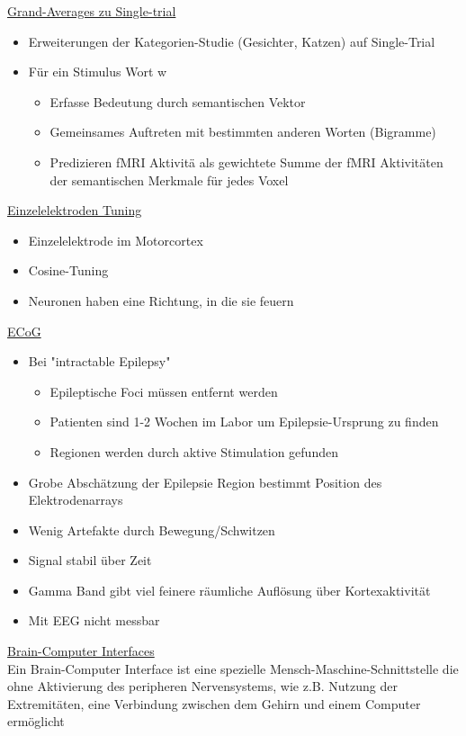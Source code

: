 \documentclass[a4paper,10pt,oneside]{article}
\begin{document}
\underline{Grand-Averages zu Single-trial} \\
	\begin{itemize}
		\item Erweiterungen der Kategorien-Studie (Gesichter, Katzen) auf Single-Trial
		\item Für ein Stimulus Wort w
			\begin{itemize}
				\item Erfasse Bedeutung durch semantischen Vektor
				\item Gemeinsames Auftreten mit bestimmten anderen Worten (Bigramme)
				\item Predizieren fMRI Aktivitä als gewichtete Summe der fMRI Aktivitäten der semantischen Merkmale für jedes Voxel
			\end{itemize}
	\end{itemize}

\underline{Einzelelektroden Tuning} \\
	\begin{itemize}
		\item Einzelelektrode im Motorcortex
		\item Cosine-Tuning
		\item Neuronen haben eine Richtung, in die sie feuern
	\end{itemize}
	
\underline{ECoG} \\
	\begin{itemize}
		\item Bei "intractable Epilepsy"
			\begin{itemize}
				\item Epileptische Foci müssen entfernt werden
				\item Patienten sind 1-2 Wochen im Labor um Epilepsie-Ursprung zu finden
				\item Regionen werden durch aktive Stimulation gefunden
			\end{itemize}
		\item Grobe Abschätzung der Epilepsie Region bestimmt Position des Elektrodenarrays
		\item Wenig Artefakte durch Bewegung/Schwitzen
		\item Signal stabil über Zeit
		\item Gamma Band gibt viel feinere räumliche Auflösung über Kortexaktivität
		\item Mit EEG nicht messbar
	\end{itemize}
	
\underline{Brain-Computer Interfaces} \\
Ein Brain-Computer Interface ist eine spezielle Mensch-Maschine-Schnittstelle die ohne Aktivierung des peripheren Nervensystems, wie z.B. Nutzung der Extremitäten, eine Verbindung zwischen dem Gehirn und einem Computer ermöglicht 
 		
\end{document}
